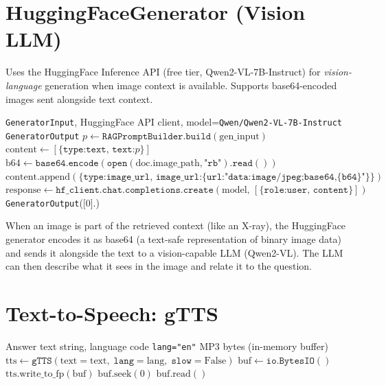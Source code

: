 \documentclass[12pt,a4paper]{article}
\theoremstyle{definition}
\theoremstyle{plain}
\theoremstyle{remark}
\newcommand{\layman}[1]{\begin{tcolorbox}[laymanstyle]#1\end{tcolorbox}}
\begin{document}
\section{HuggingFaceGenerator (Vision LLM)}

\begin{tcolorbox}[defstyle, title={Definition 6.1 — HuggingFaceGenerator (Multimodal)}]
Uses the HuggingFace Inference API (free tier, Qwen2-VL-7B-Instruct) for \emph{vision-language} generation when image context is available. Supports base64-encoded images sent alongside text context.
\end{tcolorbox}

\begin{algorithm}[H]
\caption{HuggingFaceGenerator.generate(gen\_input)}
\begin{algorithmic}[1]
\Require \texttt{GeneratorInput}, HuggingFace API client, model=\texttt{Qwen/Qwen2-VL-7B-Instruct}
\Ensure \texttt{GeneratorOutput}
\State $p \gets \texttt{RAGPromptBuilder.build}(\text{gen\_input})$
\State $\text{content} \gets [\{\texttt{type:text, text:}p\}]$
    \State $\text{b64} \gets \texttt{base64.encode}(\texttt{open}(\text{doc.image\_path}, \texttt{"rb"}).\texttt{read}())$
    \State $\text{content.append}(\{\texttt{type:image\_url, image\_url:\{url:"data:image/jpeg;base64,\{b64\}"\}}\})$
  \EndIf
\EndFor
\State $\text{response} \gets \texttt{hf\_client.chat.completions.create}(\text{model},\, [\{\texttt{role:user, content}\}])$
\State \Return \texttt{GeneratorOutput}([0].)
\end{algorithmic}
\end{algorithm}

\layman{When an image is part of the retrieved context (like an X-ray), the HuggingFace generator encodes it as base64 (a text-safe representation of binary image data) and sends it alongside the text to a vision-capable LLM (Qwen2-VL). The LLM can then describe what it sees in the image and relate it to the question.}

\section{Text-to-Speech: gTTS}

\begin{algorithm}[H]
\caption{TTSConverter.convert(text) $\to$ audio\_bytes}
\begin{algorithmic}[1]
\Require Answer text string, language code \texttt{lang="en"}
\Ensure MP3 bytes (in-memory buffer)
\State $\text{tts} \gets \texttt{gTTS}(\text{text}=\text{text},\; \texttt{lang}=\text{lang},\; \texttt{slow}=\text{False})$
\State $\text{buf} \gets \texttt{io.BytesIO}()$
\State $\text{tts.write\_to\_fp}(\text{buf})$
\State $\text{buf.seek}(0)$
\State \Return $\text{buf.read}()$ 
\end{algorithmic}
\end{algorithm}
\end{document}
